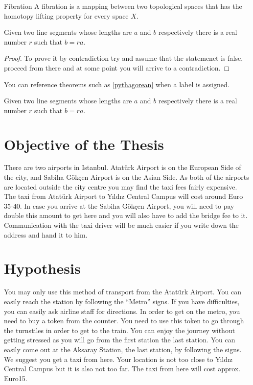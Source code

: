 \theoremstyle{definition}
\begin{definition}{Fibration}
A fibration is a mapping between two topological spaces that has the homotopy lifting property for every space $X$.
\end{definition}

\begin{lemma}
Given two line segments whose lengths are $a$ and $b$ respectively there 
is a real number $r$ such that $b=ra$.
\end{lemma}
 
\begin{proof}
To prove it by contradiction try and assume that the statemenet is false,
proceed from there and at some point you will arrive to a contradiction.
\end{proof}

 
You can reference theorems such as \ref{pythagorean} when a label is assigned.
 
\begin{lemma}
Given two line segments whose lengths are $a$ and $b$ respectively there is a 
real number $r$ such that $b=ra$.
\end{lemma}

\section{Objective of the Thesis}
There are two airports in Istanbul. Atatürk Airport is on the European Side of the city, and Sabiha Gökçen Airport is on the Asian Side. As both of the airports are located outside the city centre you may find the taxi fees fairly expensive. The taxi from Atatürk Airport to Yıldız Central Campus will cost around Euro 35-40. In case you arrive at the Sabiha Gökçen Airport, you will need to pay double this amount to get here and you will also have to add the bridge fee to it. Communication with the taxi driver will be much easier if you write down the address and hand it to him.

\section{Hypothesis}
You may only use this method of transport from the Atatürk Airport. You can easily reach the station by following the “Metro” signs. If you have difficulties, you can easily ask airline staff for directions. In order to get on the metro, you need to buy a token from the counter. You need to use this token to go through the turnstiles in order to get to the train. You can enjoy the journey without getting stressed as you will go from the first station the last station. You can easily come out at the Aksaray Station, the last station, by following the signs. We suggest you get a taxi from here. Your location is not too close to Yıldız Central Campus but it is also not too far. The taxi from here will cost approx. Euro15.
